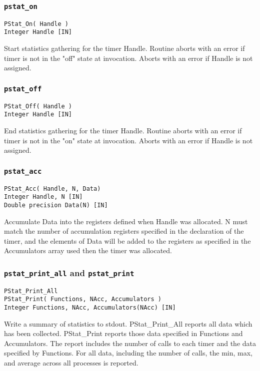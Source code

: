\subsubsection{{\tt pstat\_on}}
\begin{verbatim}
PStat_On( Handle )
Integer Handle [IN]
\end{verbatim}
Start statistics gathering for the timer Handle.  Routine
aborts with an error if timer is not in the "off" state at
invocation.  Aborts with an error if Handle is not assigned.

\subsubsection{{\tt pstat\_off}}
\begin{verbatim}
PStat_Off( Handle )
Integer Handle [IN]
\end{verbatim}
End statistics gathering for the timer Handle.  Routine aborts
with an error if timer is not in the "on" state at invocation.
Aborts with an error if Handle is not assigned.

\subsubsection{{\tt pstat\_acc}}
\begin{verbatim}
PStat_Acc( Handle, N, Data)
Integer Handle, N [IN]
Double precision Data(N) [IN]
\end{verbatim}
Accumulate Data into the registers defined when Handle was
allocated. N must match the number of accumulation registers
specified in the declaration of the timer, and the elements of
Data will be added to the registers as specified in the
Accumulators array used then the timer was allocated.

\subsubsection{{\tt pstat\_print\_all} and {\tt pstat\_print}}
\begin{verbatim}
PStat_Print_All
PStat_Print( Functions, NAcc, Accumulators )
Integer Functions, NAcc, Accumulators(NAcc) [IN]
\end{verbatim}
Write a summary of statistics to stdout.  PStat\_Print\_All
reports all data which has been collected.  PStat\_Print
reports those data specified in Functions and Accumulators.
The report includes the number of calls to each timer and the
data specified by Functions.  For all data, including the
number of calls, the min, max, and average across all
processes is reported.
        
